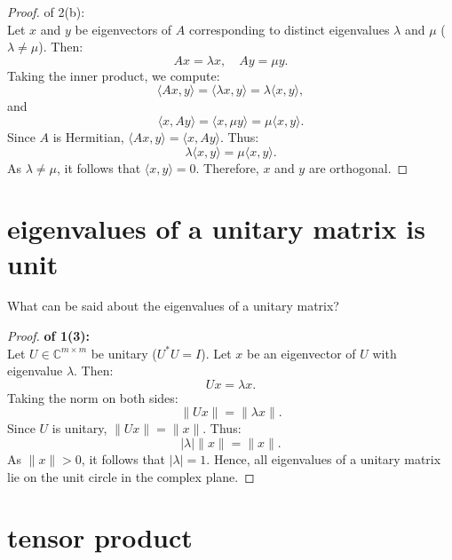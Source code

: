 \documentclass[lang=cn,11pt]{elegantbook}
\begin{document}
\begin{proof}
of 2(b):\\
Let \( x \) and \( y \) be eigenvectors of \( A \) corresponding to distinct eigenvalues \( \lambda \) and \( \mu \) (\( \lambda \neq \mu \)). Then:
\[
A x = \lambda x, \quad A y = \mu y.
\]
Taking the inner product, we compute:
\[
\langle A x, y \rangle = \langle \lambda x, y \rangle = \lambda \langle x, y \rangle,
\]
and
\[
\langle x, A y \rangle = \langle x, \mu y \rangle = \mu \langle x, y \rangle.
\]
Since \( A \) is Hermitian, \( \langle A x, y \rangle = \langle x, A y \rangle \). Thus:
\[
\lambda \langle x, y \rangle = \mu \langle x, y \rangle.
\]
As \( \lambda \neq \mu \), it follows that \( \langle x, y \rangle = 0 \). Therefore, \( x \) and \( y \) are orthogonal.
\end{proof}

\section{eigenvalues of a unitary matrix is unit}

What can be said about the eigenvalues of a unitary matrix?


\begin{proof}
\textbf{of 1(3): }  \\
Let \( U \in \mathbb{C}^{m \times m} \) be unitary (\( U^* U = I \)). Let \( x \) be an eigenvector of \( U \) with eigenvalue \( \lambda \). Then:
\[
U x = \lambda x.
\]
Taking the norm on both sides:
\[
\|U x\| = \|\lambda x\|.
\]
Since \( U \) is unitary, \( \|U x\| = \|x\| \). Thus:
\[
|\lambda| \|x\| = \|x\|.
\]
As \( \|x\| > 0 \), it follows that \( |\lambda| = 1 \). Hence, all eigenvalues of a unitary matrix lie on the unit circle in the complex plane.
\end{proof}


\section{tensor product}
\end{document}
